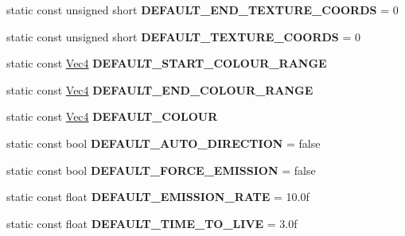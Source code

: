 \begin{DoxyCompactItemize}
\item 
\mbox{\label{classPUEmitter_ab21d065cae6fb7c5764ea432a5261145}} 
static const unsigned short {\bfseries D\+E\+F\+A\+U\+L\+T\+\_\+\+E\+N\+D\+\_\+\+T\+E\+X\+T\+U\+R\+E\+\_\+\+C\+O\+O\+R\+DS} = 0
\item 
\mbox{\label{classPUEmitter_a7b8459983cb366189c3d458ce9be1fc1}} 
static const unsigned short {\bfseries D\+E\+F\+A\+U\+L\+T\+\_\+\+T\+E\+X\+T\+U\+R\+E\+\_\+\+C\+O\+O\+R\+DS} = 0
\item 
\mbox{\label{classPUEmitter_a5ca92482aeba184e1b6aa78038714854}} 
static const \hyperlink{classVec4}{Vec4} {\bfseries D\+E\+F\+A\+U\+L\+T\+\_\+\+S\+T\+A\+R\+T\+\_\+\+C\+O\+L\+O\+U\+R\+\_\+\+R\+A\+N\+GE}
\item 
\mbox{\label{classPUEmitter_a9ed55037f1549ab28237c156a61dca52}} 
static const \hyperlink{classVec4}{Vec4} {\bfseries D\+E\+F\+A\+U\+L\+T\+\_\+\+E\+N\+D\+\_\+\+C\+O\+L\+O\+U\+R\+\_\+\+R\+A\+N\+GE}
\item 
\mbox{\label{classPUEmitter_ad3e76777c4704036ca212f29753e6f9b}} 
static const \hyperlink{classVec4}{Vec4} {\bfseries D\+E\+F\+A\+U\+L\+T\+\_\+\+C\+O\+L\+O\+UR}
\item 
\mbox{\label{classPUEmitter_a91180390a34f9ad5dd8955e45a4d6bfa}} 
static const bool {\bfseries D\+E\+F\+A\+U\+L\+T\+\_\+\+A\+U\+T\+O\+\_\+\+D\+I\+R\+E\+C\+T\+I\+ON} = false
\item 
\mbox{\label{classPUEmitter_a8ccbc9593ee1fe2696c35de46cc9e1b4}} 
static const bool {\bfseries D\+E\+F\+A\+U\+L\+T\+\_\+\+F\+O\+R\+C\+E\+\_\+\+E\+M\+I\+S\+S\+I\+ON} = false
\item 
\mbox{\label{classPUEmitter_abe746f472062fb7c2362932ecf53767f}} 
static const float {\bfseries D\+E\+F\+A\+U\+L\+T\+\_\+\+E\+M\+I\+S\+S\+I\+O\+N\+\_\+\+R\+A\+TE} = 10.\+0f
\item 
\mbox{\label{classPUEmitter_a2ef30ea6780fb03bd4661b76f157e62c}} 
static const float {\bfseries D\+E\+F\+A\+U\+L\+T\+\_\+\+T\+I\+M\+E\+\_\+\+T\+O\+\_\+\+L\+I\+VE} = 3.\+0f
\item 

\end{DoxyCompactItemize}
